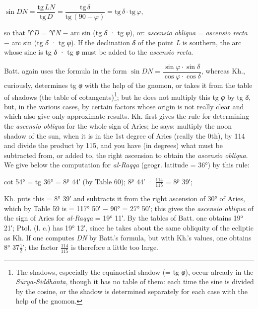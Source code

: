 \documentclass[11pt]{article}
\newcommand{\Pg}[1]{\marginpar{\footnotesize\color{gray}#1}}
\begin{document}
\par\begin{center}$\sin DN = \dfrac{\mathrm{tg}\,LN}{\mathrm{tg}\,D} = \dfrac{\mathrm{tg}\,\delta}{\mathrm{tg}\,(90-\varphi)} = \mathrm{tg}\,\delta\cdot\mathrm{tg}\,\varphi$,\end{center}
\par so that {\SignFont\upshape ♈}\emph{D} = {\SignFont\upshape ♈}\emph{N} − arc sin (tg \emph{{\greekfont δ}} · tg \emph{{\greekfont φ}}), or: \emph{ascensio obliqua} = \emph{ascensio recta} − arc sin (tg \emph{{\greekfont δ}} · tg \emph{{\greekfont φ}}). If the declination \emph{{\greekfont δ}} of the point \emph{L} is southern, the arc whose sine is tg \emph{{\greekfont δ}} · tg \emph{{\greekfont φ}} must be added to the \emph{ascensio recta}.\par
\par \Pg{75}Batt. again uses the formula in the form $\sin DN = \dfrac{\sin\varphi\cdot\sin\delta}{\cos\varphi\cdot\cos\delta}$, whereas Kh., curiously, determines tg \emph{{\greekfont φ}} with the help of the gnomon, or takes it from the table of shadows (the table of cotangents)\footnote{The shadows, especially the equinoctial shadow (= tg \emph{{\greekfont φ}}), occur already in the \emph{Sūrya-Siddhānta}, though it has no table of them: each time the sine is divided by the cosine, or the shadow is determined separately for each case with the help of the gnomon.}; but he does not multiply this tg \emph{{\greekfont φ}} by tg \emph{{\greekfont δ}}, but, in the various cases, by certain factors whose origin is not really clear and which also give only approximate results. Kh. first gives the rule for determining the \emph{ascensio obliqua} for the whole sign of Aries; he says: multiply the noon shadow of the sun, when it is in the 1st degree of Aries (really the 0th), by 114 and divide the product by 115, and you have (in degrees) what must be subtracted from, or added to, the right ascension to obtain the \emph{ascensio obliqua}. We give below the computation for \emph{al-Raqqa} (geogr. latitude = 36°) by this rule:\par
\par\begin{center}cot 54° = tg 36° = 8$^{p}$ 44′ (by Table 60); 8$^{p}$ 44′ · $\tfrac{114}{115}$ = 8$^{p}$ 39′;\end{center}
\par Kh. puts this = 8° 39′ and subtracts it from the right ascension of 30° of Aries, which by Table 59 is = 117° 50′ − 90° = 27° 50′; this gives the \emph{ascensio obliqua} of the sign of Aries for \emph{al-Raqqa} = 19° 11′. By the tables of Batt. one obtains 19° 21′; Ptol. (l. c.) has 19° 12′, since he takes about the same obliquity of the ecliptic as Kh. If one computes \emph{DN} by Batt.'s formula, but with Kh.'s values, one obtains 8° 37$\tfrac{1}{2}$′; the factor $\tfrac{114}{115}$ is therefore a little too large.\par
\end{document}
